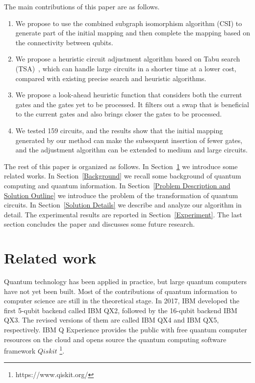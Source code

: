 \documentclass[runningheads]{llncs}
\begin{document}
The main contributions of this paper are as follows.
	\begin{enumerate}
	\item We propose to use the combined subgraph isomorphism algorithm (CSI) to generate part of the initial mapping
    and then complete the mapping based on the connectivity between qubits.
	\item We propose a heuristic circuit adjustment algorithm based on Tabu search (TSA)~\cite{Glover1990}, which can handle large circuits in a shorter time at a lower cost, compared with existing precise search and heuristic algorithms.
	\item  We propose a look-ahead heuristic function that considers both the current gates and the  gates yet to be processed. It filters out a swap that is beneficial to the current gates and also brings closer the gates to be processed.
	\item We tested 159 circuits, and the results show that the initial mapping generated by our method can make the subsequent insertion of fewer gates, and the adjustment algorithm can be extended to medium and large circuits.
	\end{enumerate}

The rest of this paper is organized as follows.
In Section~\ref{Related work} we introduce some related works. 
In Section~\ref{Background} we recall some background of quantum computing and quantum information. In Section~\ref{Problem Description and Solution Outline}
we introduce the problem of the transformation of quantum circuits.
In Section~\ref{Solution Details} we describe and analyze our algorithm in detail.
The experimental results are reported in Section~\ref{Experiment}. 
The last section concludes the paper and discusses some future research.

\section{Related work}
\label{Related work}
Quantum technology has been applied in practice, but large quantum computers have not yet been built. Most of the contributions of quantum information to computer science are still in the theoretical stage. In 2017, IBM developed the first 5-qubit backend called IBM QX2, followed by the 16-qubit backend  IBM QX3. The revised versions of them are called IBM QX4 and IBM QX5, respectively. IBM Q Experience provides the public with free quantum computer resources on the cloud and opens source the quantum computing software framework $Qiskit$ \footnote{https://www.qiskit.org/}. 
\end{document}
